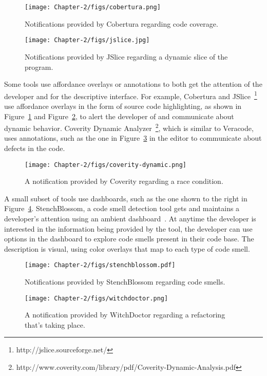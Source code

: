 \begin{figure}
	\centering
	\texttt{[image: Chapter-2/figs/cobertura.png]}
	\caption{Notifications provided by Cobertura regarding code coverage.}
	\label{fig:cobertura}
\end{figure}

\begin{figure}
	\centering
	\texttt{[image: Chapter-2/figs/jslice.jpg]}
	\caption{Notifications provided by JSlice regarding a dynamic slice of the program.}
	\label{fig:jslice}
\end{figure}


Some tools use affordance overlays or annotations to both get the attention of the developer and for the descriptive interface. For example, Cobertura and JSlice~\footnote{http://jslice.sourceforge.net/} use affordance overlays in the form of source code highlighting, as shown in Figure~\ref{fig:cobertura} and Figure~\ref{fig:jslice}, to alert the developer of and communicate about dynamic behavior. Coverity Dynamic Analyzer~\footnote{http://www.coverity.com/library/pdf/Coverity-Dynamic-Analysis.pdf}, which is similar to Veracode, uses annotations, such as the one in Figure~\ref{fig:coverity} in the editor to communicate about defects in the code.

\begin{figure}
	\centering
	\texttt{[image: Chapter-2/figs/coverity-dynamic.png]}
	\caption{A notification provided by Coverity regarding a race condition.}
	\label{fig:coverity}
\end{figure}

A small subset of tools use dashboards, such as the one shown to the right in Figure~\ref{fig:stench}. StenchBlossom, a code smell detection tool gets and maintains a developer's attention using an ambient dashboard~\cite{Murphy-Hill:2010:Ambient}. At anytime the developer is interested in the information being provided by the tool, the developer can use options in the dashboard to explore code smells present in their code base. The description is visual, using color overlays that map to each type of code smell. 

\begin{figure}
	\centering
	\texttt{[image: Chapter-2/figs/stenchblossom.pdf]}
	\caption{Notifications provided by StenchBlossom regarding code smells.}
	\label{fig:stench}
\end{figure}

\begin{figure}
	\centering
	\texttt{[image: Chapter-2/figs/witchdoctor.png]}
	\caption{A notification provided by WitchDoctor regarding a refactoring that's taking place.}
	\label{fig:witch}
\end{figure}

